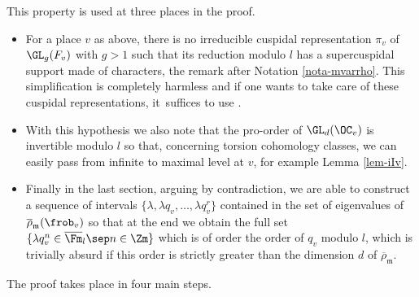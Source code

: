 This property is used at three places in the proof.
\begin{itemize}
\item For a place $v$ as above, there is no irreducible cuspidal representation
$\pi_v$ of $\GL_g(F_v)$ with $g>1$ such that its reduction modulo $l$ has a supercuspidal
support made of characters, \cf the remark after Notation \ref{nota-mvarrho}.
This simplification is completely harmless and if one wants to take care of
these cuspidal representations, it~suffices to use \cite[Prop.\,2.4.1]{boyer-duke}.

\item With this hypothesis we also note that the pro-order of $\GL_d(\OC_v)$ is invertible
modulo $l$ so that, concerning torsion cohomology classes,
we can easily pass from infinite to maximal level at $v$, \cf for example Lemma \ref{lem-iIv}.

\item Finally in the last section, arguing by contradiction,
we are able to construct a sequence of intervals
$\{\lambda, \lambda q_v,\dots, \lambda q_v^{r}\}$ contained in the set of eigenvalues of
$\overline \rho_{\mathfrak m}(\frob_v)$ so that at the end we obtain the full set
$\{\lambda q_v^n \in \overline \Fm_l\sep n \in \Zm\}$ which is of order the order of $q_v$ modulo $l$, which
is trivially absurd if this order is strictly greater than the dimension $d$ of
$\overline \rho_{\mathfrak m}$.
\end{itemize}

The proof takes place in four main steps.


